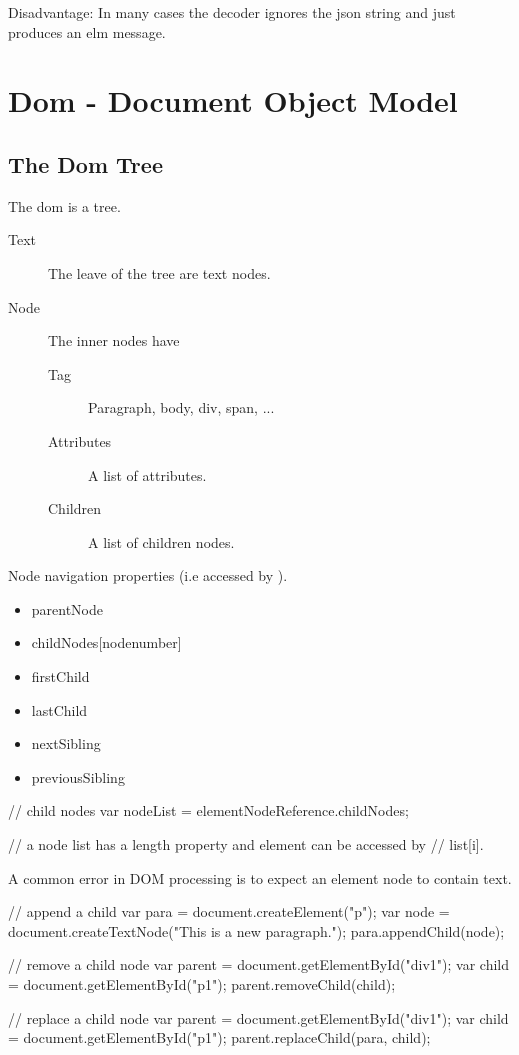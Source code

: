 Disadvantage: In many cases the decoder ignores the json string and just
produces an elm message.

\section{Dom - Document Object Model}
\label{sec:dom}


\subsection{The Dom Tree}

The dom is a tree.
\begin{description}
\item[Text] The leave of the tree are text nodes.

\item[Node] The inner nodes have

  \begin{description}
  \item[Tag] Paragraph, body, div, span, ...
  \item[Attributes] A list of attributes.
  \item[Children] A list of children nodes.
  \end{description}

\end{description}

Node navigation properties (i.e accessed by ).
\begin{itemize}
\item
  parentNode
\item
  childNodes[nodenumber]
\item
  firstChild
\item
  lastChild
\item
  nextSibling
\item
  previousSibling
\end{itemize}

\begin{js}
  // child nodes
  var nodeList = elementNodeReference.childNodes;

  // a node list has a length property and element can be accessed by
  // list[i].
\end{js}

A common error in DOM processing is to expect an element node to contain text.

\begin{js}
  // append a child
  var para = document.createElement("p");
  var node = document.createTextNode("This is a new paragraph.");
  para.appendChild(node);

  // remove a child node
  var parent = document.getElementById("div1");
  var child = document.getElementById("p1");
  parent.removeChild(child);

  // replace a child node
  var parent = document.getElementById("div1");
  var child = document.getElementById("p1");
  parent.replaceChild(para, child);
\end{js}

